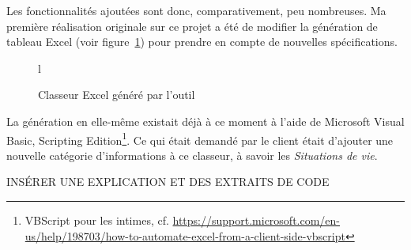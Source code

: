 Les fonctionnalités ajoutées sont donc, comparativement, peu nombreuses. Ma première réalisation originale sur ce projet a été de modifier la génération de tableau Excel (voir figure~\ref{fig:classeur}) pour prendre en compte de nouvelles spécifications.

\begin{figure}{l}
  \caption{Classeur Excel généré par l'outil}
  \label{fig:classeur}
\end{figure}

La génération en elle-même existait déjà à ce moment à l'aide de Microsoft Visual Basic, Scripting Edition\footnote{VBScript pour les intimes, cf. \url{https://support.microsoft.com/en-us/help/198703/how-to-automate-excel-from-a-client-side-vbscript}}. Ce qui était demandé par le client était d'ajouter une nouvelle catégorie d'informations à ce classeur, à savoir les \emph{Situations de vie}.

INSÉRER UNE EXPLICATION ET DES EXTRAITS DE CODE
